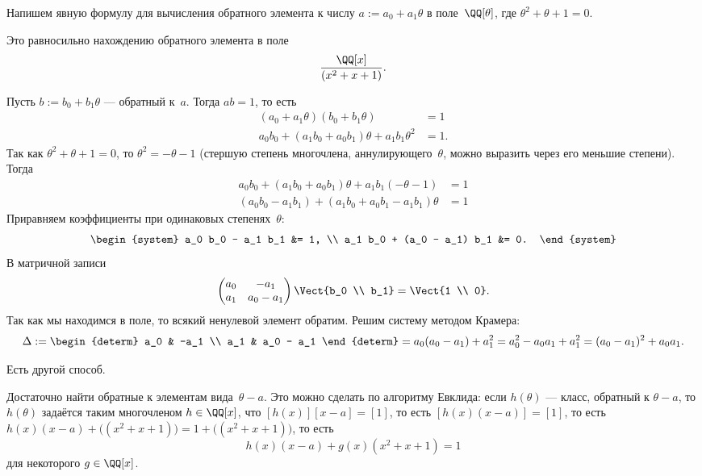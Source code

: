 \begin{example}
	Напишем явную формулу для вычисления обратного элемента к числу $a := a_0 + a_1 \theta$ в поле~$\QQ[\theta]$, где $\theta^2 + \theta + 1 = 0$.

	Это равносильно нахождению обратного элемента в поле
	\[
		\frac{\QQ[x]}{(x^2 + x + 1)}
		.
	\]

	Пусть $b := b_0 + b_1\theta$ --- обратный к~$a$. Тогда $ab = 1$, то есть
	\begin{align*}
		(a_0 + a_1 \theta) (b_0 + b_1 \theta) &= 1
		\\
		a_0 b_0 + (a_1 b_0 + a_0 b_1) \theta + a_1 b_1 \theta^2 &= 1
		.
	\end{align*}
	Так как $\theta^2 + \theta + 1 = 0$, то $\theta^2 = -\theta - 1$ (стершую степень многочлена, аннулирующего~$\theta$, можно выразить через его меньшие степени). Тогда
	\begin{align*}
		a_0 b_0 + (a_1 b_0 + a_0 b_1) \theta + a_1 b_1 (-\theta - 1) &= 1
		\\
		(a_0 b_0 - a_1 b_1) +
		(a_1 b_0 + a_0 b_1 - a_1 b_1) \theta &= 1
	\end{align*}
	Приравняем коэффициенты при одинаковых степенях~$\theta$:
	\[
		\begin{system}
			a_0 b_0 - a_1 b_1 &= 1,
			\\
			a_1 b_0 + (a_0 - a_1) b_1 &= 0.
		\end{system}
	\]
	В матричной записи
	\[
		\begin{pmatrix}
			a_0 & -a_1
			\\
			a_1 & a_0 - a_1
		\end{pmatrix}
		\Vect{b_0 \\ b_1}
		=
		\Vect{1 \\ 0}.
	\]
	Так как мы находимся в поле, то всякий ненулевой элемент обратим. Решим систему методом Крамера:
	\[
		\Delta :=
		\begin{determ}
			a_0 & -a_1
			\\
			a_1 & a_0 - a_1
		\end{determ}
		=
		a_0 (a_0 - a_1) + a_1^2 =
		a_0^2 - a_0 a_1 + a_1^2 =
		(a_0 - a_1)^2 + a_0 a_1.
	\]

	\textstars

	Есть другой способ.

	Достаточно найти обратные к элементам вида~$\theta - a$. Это можно сделать по алгоритму Евклида: если $h(\theta)$ --- класс, обратный к $\theta - a$, то $h(\theta)$ задаётся таким многочленом $h \in \QQ[x]$, что $[h(x)][x-a] = [1]$, то есть $[h(x)(x-a)] = [1]$, то есть $h(x)(x-a) + \bigl( (x^2 + x + 1) \bigr) = 1 + \bigl( (x^2 + x + 1) \bigr)$, то есть
	\[
		h(x) (x - a) + g(x)(x^2 + x + 1) = 1
	\]
	для некоторого $g \in \QQ[x]$.


\end{example}
